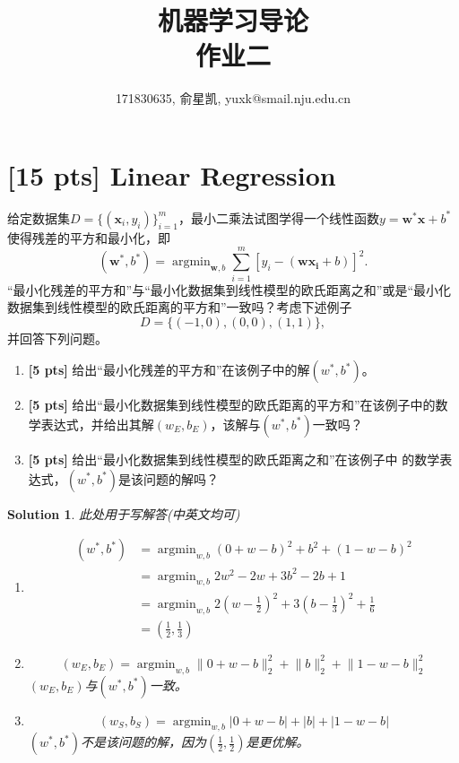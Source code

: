 \documentclass[a4paper,UTF8]{article}
\numberwithin{equation}{section}
\newtheorem*{solution}{Solution}
\begin{document}
\title{机器学习导论\\
作业二}
\author{171830635, 俞星凯, yuxk@smail.nju.edu.cn}
\maketitle

\section{[15 pts] Linear Regression}
给定数据集$D=\{(\mathbf{x}_i,y_i)\}_{i=1}^m$，最小二乘法试图学得一个线性函数$y=\mathbf{w^*}\mathbf{x}+b^*$使得残差的平方和最小化，即
\begin{equation}
	(\mathbf{w^*},b^*) = \mathop{\arg\min}_{\mathbf{w},b} \sum_{i=1}^m [y_i-(\mathbf{w}\mathbf{x_i}+b)]^2 . 
\end{equation}
“最小化残差的平方和”与“最小化数据集到线性模型的欧氏距离之和”或是“最小化数据集到线性模型的欧氏距离的平方和”一致吗？考虑下述例子
\begin{equation}
	D = \{ (-1,0) , (0,0) , (1,1) \} , 
\end{equation}
并回答下列问题。

\begin{enumerate}[(1)]
	\item \textbf{[5 pts]} 给出“最小化残差的平方和”在该例子中的解$(w^*,b^*)$。
	\item \textbf{[5 pts]} 给出“最小化数据集到线性模型的欧氏距离的平方和”在该例子中的数学表达式，并给出其解$(w_{E},b_{E})$，该解与$(w^*,b^*)$一致吗？
	\item \textbf{[5 pts]} 给出“最小化数据集到线性模型的欧氏距离之和”在该例子中
	的数学表达式，$(w^*,b^*)$是该问题的解吗？
\end{enumerate}

\begin{solution}
	此处用于写解答(中英文均可)
	\begin{enumerate}[(1)]
		\item 
		\begin{align*}
		(w^*,b^*)
		&=\mathop{\arg\min}_{w,b}(0+w-b)^2+b^2+(1-w-b)^2\\
		&=\mathop{\arg\min}_{w,b}2w^2-2w+3b^2-2b+1\\
		&=\mathop{\arg\min}_{w,b}2(w-\frac12)^2+3(b-\frac13)^2+\frac16\\
		&=(\frac12,\frac13)
		\end{align*}
		
		\item 
		\begin{equation*}
		(w_E,b_E)=\mathop{\arg\min}_{w,b}\lVert 0+w-b\rVert_2^2+\lVert b\lVert_2^2+\lVert 1-w-b\rVert_2^2
		\end{equation*}
		$(w_E,b_E)$与$(w^*,b^*)$一致。
		
		\item 
		\begin{equation*}
		(w_S,b_S)=\mathop{\arg\min}_{w,b}\lvert0+w-b\rvert+\lvert b\rvert+\lvert1-w-b\rvert
		\end{equation*}
		$(w^*,b^*)$不是该问题的解，因为$(\frac12,\frac12)$是更优解。
		
	\end{enumerate}
\end{solution}
\end{document}
